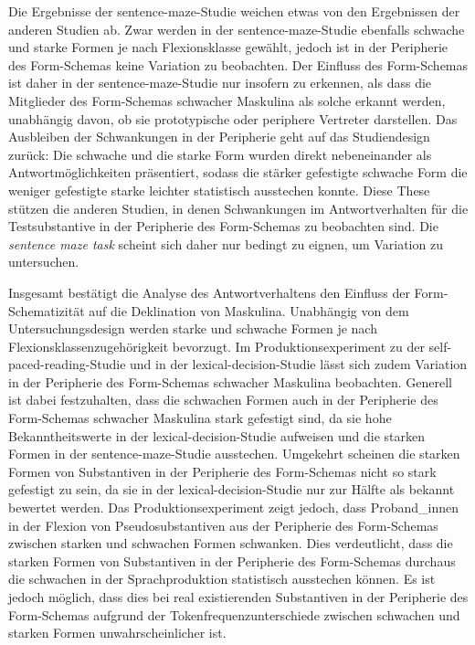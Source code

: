 Die Ergebnisse der sentence-maze-Studie weichen etwas von den Ergebnissen der anderen Studien ab. Zwar werden in der sentence-maze-Studie ebenfalls schwache und starke Formen je nach Flexionsklasse gewählt, jedoch ist in der Peripherie des Form-Schemas keine Variation zu beobachten. Der Einfluss des Form-Schemas ist daher in der sentence-maze-Studie nur insofern zu erkennen, als dass die Mitglieder des Form-Schemas schwacher Maskulina als solche erkannt werden, unabhängig davon, ob sie prototypische oder periphere Vertreter darstellen. Das Ausbleiben der Schwankungen in der Peripherie geht auf das Studiendesign zurück: Die schwache und die starke Form wurden direkt nebeneinander als Antwortmöglichkeiten präsentiert, sodass die stärker gefestigte schwache Form die weniger gefestigte starke leichter statistisch ausstechen konnte. Diese These stützen die anderen Studien, in denen Schwankungen im Antwortverhalten für die Testsubstantive in der Peripherie des Form-Schemas zu beobachten sind. Die \textit{sentence maze task} scheint sich daher nur bedingt zu eignen, um Variation zu untersuchen.

Insgesamt bestätigt die Analyse des Antwortverhaltens den Einfluss der Form-Schematizität auf die Deklination von Maskulina. Unabhängig von dem Un\-ter\-su\-chungs\-de\-sign werden starke und schwache Formen je nach Flexionsklassenzugehörigkeit bevorzugt. Im Produktionsex\-periment zu der self-paced-reading-Studie und in der lexical-decision-Studie lässt sich zudem Variation in der Peripherie des Form-Schemas schwacher Maskulina beobachten. Generell ist dabei festzuhalten, dass die schwachen Formen auch in der Peripherie des Form-Schemas schwacher Maskulina stark gefestigt sind, da sie hohe Bekanntheitswerte in der lexical-decision-Studie aufweisen und die starken Formen in der sentence-maze-Studie ausstechen. Umgekehrt scheinen die starken Formen von Substantiven in der Peripherie des Form-Schemas nicht so stark gefestigt zu sein, da sie in der lexical-decision-Studie nur zur Hälfte als bekannt bewertet werden. Das Produktionsexperiment zeigt jedoch, dass Proband\_innen in der Flexion von Pseudosubstantiven aus der Peripherie des Form-Schemas zwischen starken und schwachen Formen schwanken. Dies verdeutlicht, dass die starken Formen von Substantiven in der Peripherie des Form-Schemas durchaus die schwachen in der Sprachproduktion statistisch ausstechen können. Es ist jedoch möglich, dass dies bei real existierenden Substantiven in der Peripherie des Form-Schemas aufgrund der Tokenfrequenzunterschiede zwischen schwachen und starken Formen unwahrscheinlicher ist.

